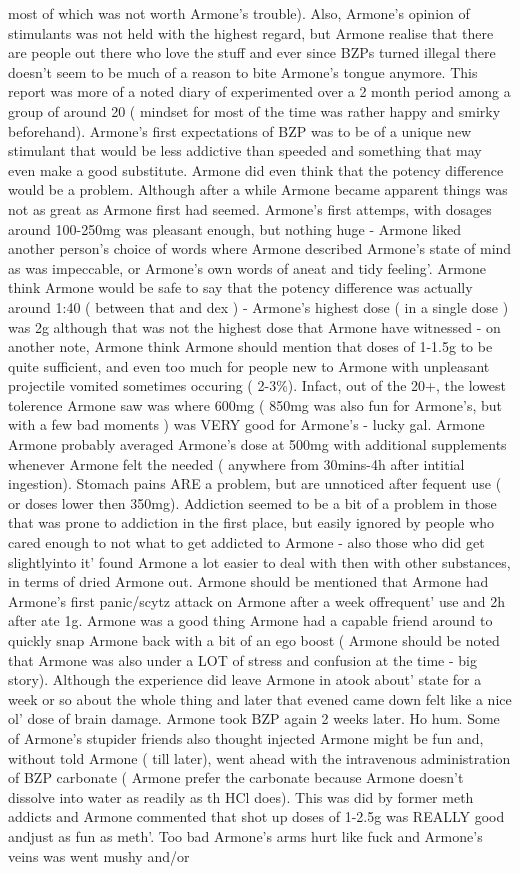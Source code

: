 \documentclass[12pt]{book}
\begin{document}
most of which was not worth Armone's trouble). Also, Armone's opinion of stimulants was not held with the highest regard, but Armone realise that there are people out there who love the stuff and ever since BZPs turned illegal there doesn't seem to be much of a reason to bite Armone's tongue anymore. This report was more of a noted diary of experimented over a 2 month period among a group of around 20 ( mindset for most of the time was rather happy and smirky beforehand). Armone's first expectations of BZP was to be of a unique new stimulant that would be less addictive than speeded and something that may even make a good substitute. Armone did even think that the potency difference would be a problem. Although after a while Armone became apparent things was not as great as Armone first had seemed. Armone's first attemps, with dosages around 100-250mg was pleasant enough, but nothing huge - Armone liked another person's choice of words where Armone described Armone's state of mind as was impeccable, or Armone's own words of aneat and tidy feeling'. Armone think Armone would be safe to say that the potency difference was actually around 1:40 ( between that and dex ) - Armone's highest dose ( in a single dose ) was 2g although that was not the highest dose that Armone have witnessed - on another note, Armone think Armone should mention that doses of 1-1.5g to be quite sufficient, and even too much for people new to Armone with unpleasant projectile vomited sometimes occuring ( 2-3\%). Infact, out of the 20+, the lowest tolerence Armone saw was where 600mg ( 850mg was also fun for Armone's, but with a few bad moments ) was VERY good for Armone's - lucky gal. Armone Armone probably averaged Armone's dose at 500mg with additional supplements whenever Armone felt the needed ( anywhere from 30mins-4h after intitial ingestion). Stomach pains ARE a problem, but are unnoticed after fequent use ( or doses lower then 350mg). Addiction seemed to be a bit of a problem in those that was prone to addiction in the first place, but easily ignored by people who cared enough to not what to get addicted to Armone - also those who did get slightlyinto it' found Armone a lot easier to deal with then with other substances, in terms of dried Armone out. Armone should be mentioned that Armone had Armone's first panic/scytz attack on Armone after a week offrequent' use and 2h after ate 1g. Armone was a good thing Armone had a capable friend around to quickly snap Armone back with a bit of an ego boost ( Armone should be noted that Armone was also under a LOT of stress and confusion at the time - big story). Although the experience did leave Armone in atook about' state for a week or so about the whole thing and later that evened came down felt like a nice ol' dose of brain damage. Armone took BZP again 2 weeks later. Ho hum. Some of Armone's stupider friends also thought injected Armone might be fun and, without told Armone ( till later), went ahead with the intravenous administration of BZP carbonate ( Armone prefer the carbonate because Armone doesn't dissolve into water as readily as th HCl does). This was did by former meth addicts and Armone commented that shot up doses of 1-2.5g was REALLY good andjust as fun as meth'. Too bad Armone's arms hurt like fuck and Armone's veins was went mushy and/or 
\end{document}
